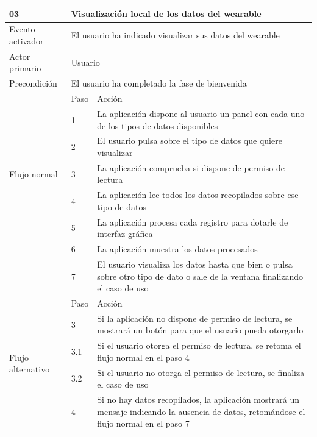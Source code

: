     \begin{table}[h]
        \centering
        \begin{tabularx}{\textwidth}{|l|l|X|}
            \hline
            03 & \multicolumn{2}{|X|}{Visualización local de los datos del \gls{wearable}} \\
            \hline
            Evento activador & \multicolumn{2}{|X|}{El usuario ha indicado visualizar sus datos del \gls{wearable}} \\
            \hline
            Actor primario & \multicolumn{2}{|X|}{Usuario} \\
            \hline
            Precondición & \multicolumn{2}{|X|}{El usuario ha completado la fase de bienvenida} \\
            \hline
            \multirow{7}{*}{Flujo normal} & Paso & Acción \\
            \cline{2-3} & 1 & La aplicación dispone al usuario un panel con cada uno de los tipos de datos disponibles \\
            \cline{2-3} & 2 & El usuario pulsa sobre el tipo de datos que quiere visualizar \\
            \cline{2-3} & 3 & La aplicación comprueba si dispone de permiso de lectura  \\
            \cline{2-3} & 4 & La aplicación lee todos los datos recopilados sobre ese tipo de datos \\
            \cline{2-3} & 5 & La aplicación procesa cada registro para dotarle de interfaz gráfica \\
            \cline{2-3} & 6 & La aplicación muestra los datos procesados \\
            \cline{2-3} & 7 & El usuario visualiza los datos hasta que bien o pulsa sobre otro tipo de dato o sale de la ventana finalizando el caso de uso \\
            \hline
            \multirow{6}{*}{Flujo alternativo} & Paso & Acción \\
            \cline{2-3} & 3 & Si la aplicación no dispone de permiso de lectura, se mostrará un botón para que el usuario pueda otorgarlo \\
            \cline{2-3} & 3.1 & Si el usuario otorga el permiso de lectura, se retoma el flujo normal en el paso 4 \\
            \cline{2-3} & 3.2 & Si el usuario no otorga el permiso de lectura, se finaliza el caso de uso \\
            \cline{2-3} & 4 & Si no hay datos recopilados, la aplicación mostrará un mensaje indicando la ausencia de datos, retomándose el flujo normal en el paso 7 \\

\end{tabularx}
\end{table}

